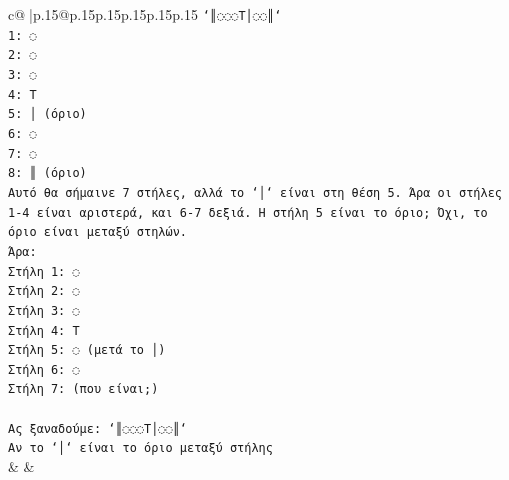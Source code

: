 \documentclass{article}
\begin{document}
{\begin{supertabular}{c@{$\;$}|p{.15\linewidth}@{}p{.15\linewidth}p{.15\linewidth}p{.15\linewidth}p{.15\linewidth}p{.15\linewidth}}
{{{\texttt{`║◌◌◌T│◌◌║`} \\
\texttt{1: ◌} \\
\texttt{2: ◌} \\
\texttt{3: ◌} \\
\texttt{4: T} \\
\texttt{5: │ (όριο)} \\
\texttt{6: ◌} \\
\texttt{7: ◌} \\
\texttt{8: ║ (όριο)} \\
\texttt{Αυτό θα σήμαινε 7 στήλες, αλλά το `│` είναι στη θέση 5. Άρα οι στήλες 1{-}4 είναι αριστερά, και 6{-}7 δεξιά. Η στήλη 5 είναι το όριο; Όχι, το όριο είναι μεταξύ στηλών.} \\
\texttt{Άρα:} \\
\texttt{Στήλη 1: ◌} \\
\texttt{Στήλη 2: ◌} \\
\texttt{Στήλη 3: ◌} \\
\texttt{Στήλη 4: T} \\
\texttt{Στήλη 5: ◌ (μετά το │)} \\
\texttt{Στήλη 6: ◌} \\
\texttt{Στήλη 7: (που είναι;)} \\
\\ 
\texttt{Ας ξαναδούμε: `║◌◌◌T│◌◌║`} \\
\texttt{Αν το `│` είναι το όριο μεταξύ στήλης} \\
            }
        }
    }
    & & \\ \\


\end{supertabular}}
\end{document}

